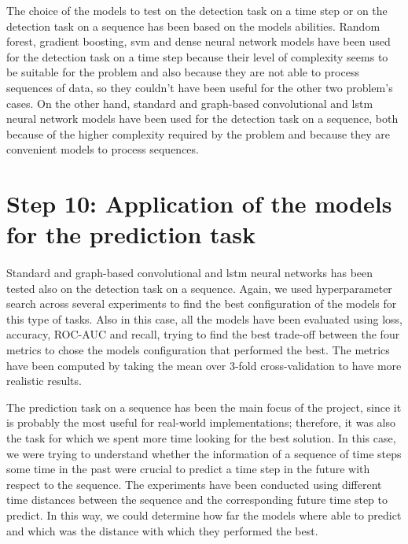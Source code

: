The choice of the models to test on the detection task on a time step or on the detection task on a sequence has been based on the models abilities. Random forest, gradient boosting, \acs{svm} and dense neural network models have been used for the detection task on a time step because their level of complexity seems to be suitable for the problem and also because they are not able to process sequences of data, so they couldn't have been useful for the other two problem's cases. On the other hand, standard and graph-based convolutional and \acs{lstm} neural network models have been used for the detection task on a sequence, both because of the higher complexity required by the problem and because they are convenient models to process sequences.


\section{Step 10: Application of the models for the prediction task} \label{sec: step_models_prediction_task}
\paragraph{} Standard and graph-based convolutional and \acs{lstm} neural networks has been tested also on the detection task on a sequence. Again, we used hyperparameter search across several experiments to find the best configuration of the models for this type of tasks. Also in this case, all the models have been evaluated using loss, accuracy, ROC-AUC and recall, trying to find the best trade-off between the four metrics to chose the models configuration that performed the best. The metrics have been computed by taking the mean over 3-fold cross-validation to have more realistic results.

The prediction task on a sequence has been the main focus of the project, since it is probably the most useful for real-world implementations; therefore, it was also the task for which we spent more time looking for the best solution. In this case, we were trying to understand whether the information of a sequence of time steps some time in the past were crucial to predict a time step in the future with respect to the sequence. The experiments have been conducted using different time distances between the sequence and the corresponding future time step to predict. In this way, we could determine how far the models where able to predict and which was the distance with which they performed the best.

